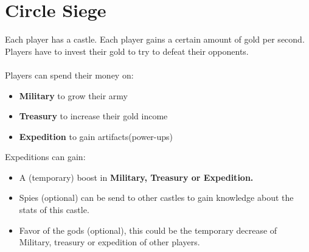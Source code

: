 \documentclass{article}
\begin{document}
\section{Circle Siege}
Each player has a castle. Each player gains a certain amount of gold per second. Players have to invest their gold to try to defeat their opponents. \\\\
Players can spend their money on:
 \begin{itemize}
 	\item \textbf{Military} to grow their army
 	\item \textbf{Treasury} to increase their gold income
 	\item \textbf{Expedition} to gain artifacts(power-ups)
 \end{itemize}
Expeditions can gain:
\begin{itemize}
	\item A (temporary) boost in \textbf{Military, Treasury or Expedition.}
	\item Spies (optional) can be send to other castles to gain knowledge about the stats of this castle.
	\item Favor of the gods (optional), this could be the temporary decrease of Military, treasury or expedition of other players.
\end{itemize}
\end{document}
